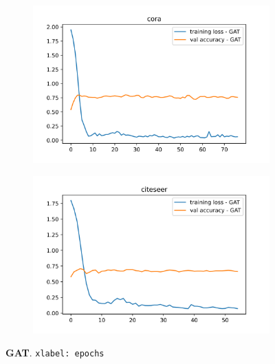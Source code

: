 \documentclass[11pt]{article}
\begin{document}
    \begin{figure}[H]
        \centering
        \begin{subfigure}{0.5\linewidth}
            \includegraphics[width=1\linewidth]{GAT_cora_best.png}
        \end{subfigure}%
        \begin{subfigure}{0.5\linewidth}
            \includegraphics[width=1\linewidth]{GAT_citeseer_best.png}
        \end{subfigure}
        \caption{\textbf{GAT}. \texttt{xlabel: epochs}}
    \end{figure}
    
\end{document}
